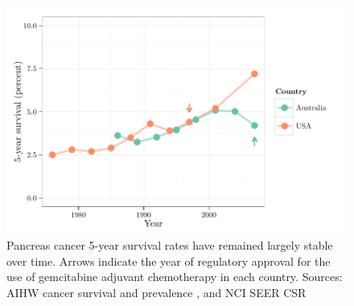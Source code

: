 \documentclass[thesis.tex]{subfiles}
\begin{document}
\begin{figure}
\centering
\includegraphics[width=.9\linewidth]{analysis/intro/figure/historical-survival-pdac-2}
\caption[Historical survival rates of pancreas cancer]{Pancreas cancer 5-year survival rates have remained largely stable over time.  Arrows indicate the year of regulatory approval for the use of gemcitabine adjuvant chemotherapy in each country.  Sources: AIHW cancer survival and prevalence \cite{CAN65}, and NCI SEER CSR \cite{SEER2014}}\label{fig:intro-historical-panc-surv}
\end{figure}

\cite{CAN65}
\end{document}
